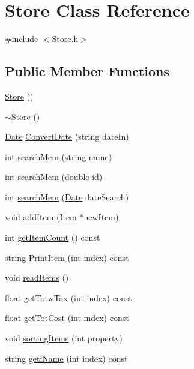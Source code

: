 \hypertarget{class_store}{}\section{Store Class Reference}
\label{class_store}


{\ttfamily \#include $<$Store.\+h$>$}

\subsection*{Public Member Functions}
\begin{DoxyCompactItemize}
\item 
\hyperlink{class_store_a5f58eadcb7385d5a5aa6830daef84f7d}{Store} ()
\item 
\hyperlink{class_store_a4fd725fdb2de0632ed98bfbd131c2512}{$\sim$\+Store} ()
\item 
\hyperlink{class_date}{Date} \hyperlink{class_store_a306a6f2696034e09f23299d71d763cef}{Convert\+Date} (string date\+In)
\item 
int \hyperlink{class_store_a8db626a297e8897378f515d40c4851be}{search\+Mem} (string name)
\item 
int \hyperlink{class_store_a3f2e9be9af9440bf6c57316b73bf7401}{search\+Mem} (double id)
\item 
int \hyperlink{class_store_ae3f4d6b2774587a486e072eed1e66cba}{search\+Mem} (\hyperlink{class_date}{Date} date\+Search)
\item 
void \hyperlink{class_store_a0606ded1ebd976497ae748e0c6cd92c4}{add\+Item} (\hyperlink{class_item}{Item} $\ast$new\+Item)
\item 
int \hyperlink{class_store_a89030908070a7788bfada532ea3272a1}{get\+Item\+Count} () const 
\item 
string \hyperlink{class_store_a72125823862d9877ab60e9126438cf56}{Print\+Item} (int index) const 
\item 
void \hyperlink{class_store_a948e593d6045fa92d1fa62b5263e57fe}{read\+Items} ()
\item 
float \hyperlink{class_store_a45c0d80073a08f8198e707390020ea94}{get\+Totw\+Tax} (int index) const 
\item 
float \hyperlink{class_store_a6b2fa4a0cfed36942a9ac31226539315}{get\+Tot\+Cost} (int index) const 
\item 
void \hyperlink{class_store_a0ca4a9faea19470a5f86c4d9bd8b9f73}{sorting\+Items} (int property)
\item 
string \hyperlink{class_store_a4cc118323e7aff41ddb3760cb095bc04}{geti\+Name} (int index) const 

\end{DoxyCompactItemize}
